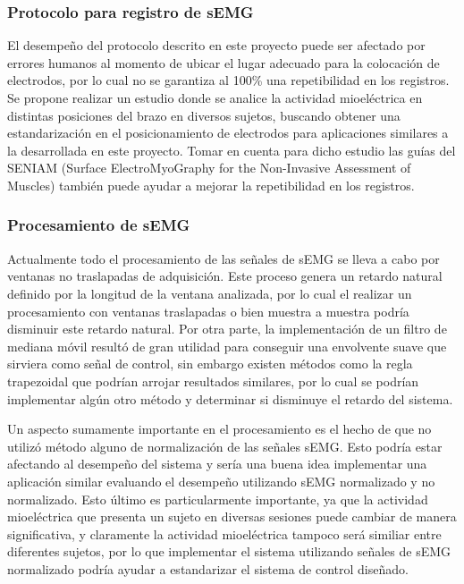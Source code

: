 \subsubsection*{Protocolo para registro de sEMG}
El desempeño del protocolo descrito en este proyecto puede ser afectado por errores humanos al momento de ubicar el lugar adecuado para la colocación de electrodos, por lo cual no se garantiza al 100\% una repetibilidad en los registros. Se propone realizar un estudio donde se analice la actividad mioeléctrica en distintas posiciones del brazo en diversos sujetos, buscando obtener una estandarización en el posicionamiento de electrodos para aplicaciones similares a la desarrollada en este proyecto. Tomar en cuenta para dicho estudio las guías del SENIAM (Surface ElectroMyoGraphy for the Non-Invasive Assessment of Muscles) también puede ayudar a mejorar la repetibilidad en los registros.

\subsubsection*{Procesamiento de sEMG}
Actualmente todo el procesamiento de las señales de sEMG se lleva a cabo por ventanas no traslapadas de adquisición. Este proceso genera un retardo natural definido por la longitud de la ventana analizada, por lo cual el realizar un procesamiento con ventanas traslapadas o bien muestra a muestra podría disminuir este retardo natural. Por otra parte, la implementación de un filtro de mediana móvil resultó de gran utilidad para conseguir una envolvente suave que sirviera como señal de control, sin embargo existen métodos como la regla trapezoidal que podrían arrojar resultados similares, por lo cual se podrían implementar algún otro método y determinar si disminuye el retardo del sistema.

Un aspecto sumamente importante en el procesamiento es el hecho de que no utilizó método alguno de normalización de las señales sEMG. Esto podría estar afectando al desempeño del sistema y sería una buena idea implementar una aplicación similar evaluando el desempeño utilizando sEMG normalizado y no normalizado. Esto último es particularmente importante, ya que la actividad mioeléctrica que presenta un sujeto en diversas sesiones puede cambiar de manera significativa, y claramente la actividad mioeléctrica tampoco será similiar entre diferentes sujetos, por lo que implementar el sistema utilizando señales de sEMG normalizado podría ayudar a estandarizar el sistema de control diseñado.

